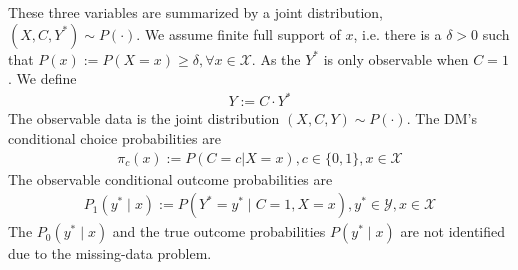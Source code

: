 \documentclass[11pt]{elegantbook}
\begin{document}
These three variables are summarized by a joint distribution, $(X,C,Y^*)\sim P(\cdot)$. We assume finite full support of $x$, i.e. there is a $\delta>0$ such that $P(x):=P(X=x)\geq \delta,\forall x\in \mathcal{X}$. As the $Y^*$ is only observable when $C=1$. We define
\begin{equation}
    \begin{aligned}
        Y:=C\cdot Y^*
    \end{aligned}
    \nonumber
\end{equation}
The observable data is the joint distribution $(X,C,Y)\sim P(\cdot)$. The DM's conditional choice probabilities are
\begin{equation}
    \begin{aligned}
        \pi_c(x):=P(C=c|X=x),c\in\{0,1\},x\in \mathcal{X}
    \end{aligned}
    \nonumber
\end{equation}
The observable conditional outcome probabilities are
\begin{equation}
    \begin{aligned}
        P_1(y^*\mid x):=P(Y^*=y^*\mid C=1, X=x),y^*\in \mathcal{Y},x\in \mathcal{X}
    \end{aligned}
    \nonumber
\end{equation}
The $P_0(y^*\mid x)$ and the true outcome probabilities $P(y^*\mid x)$ are not identified due to the missing-data problem.








\appendix











\end{document}
